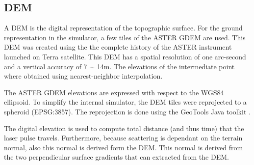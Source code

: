 \subsection{\acl{DEM}}
\label{DEM}

A \acl{DEM} is the digital representation of the topographic surface. For the ground representation
in the simulator, a few tiles of the ASTER \ac{GDEM} are used. This \ac{DEM} was created using the
the complete history of the ASTER instrument launched on Terra satellite. This \ac{DEM} has a
spatial resolution of one arc-second and a vertical accuracy of 7 $\sim$ 14m. The elevations of the
intermediate point where obtained using nearest-neighbor interpolation.

The ASTER \ac{GDEM} elevations are expressed with respect to the WGS84 ellipsoid. To simplify the
internal simulator, the \ac{DEM} tiles were reprojected to a spheroid (EPSG:3857). The reprojection
is done using the GeoTools Java toolkit \cite{geotools}.

The digital elevation is used to compute total distance (and thus time) that the laser pulse
travels. Furthermore, because scattering is dependant on the terrain normal, also this normal is
derived form the \ac{DEM}. This normal is derived from the two perpendicular surface gradients that
can extracted from the \ac{DEM}.
